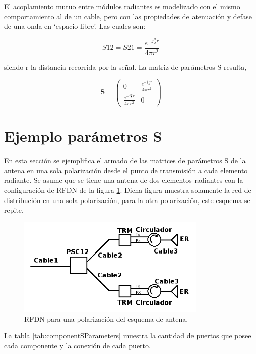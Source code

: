 El acoplamiento mutuo entre módulos radiantes es modelizado con el mismo comportamiento al de un cable, pero con las
propiedades de atenuación y defase de una onda en \enquote*{espacio libre}. Las cuales son:

\begin{equation}
	S12 = S21 = \dfrac{e^{-j\frac{\pi}{\lambda}r}}{4\pi r^2}
\end{equation}

siendo r la distancia recorrida por la señal. La matriz de parámetros S resulta,

$$
\mathbf{S} = \begin{pmatrix} 0 & \frac{e^{-j\frac{\pi}{\lambda}r}}{4\pi r^2}\\\frac{e^{-j\frac{\pi}{\lambda}r}}{4\pi r^2} & 0\end{pmatrix}
$$

\section{Ejemplo parámetros S}

En esta sección se ejemplifica el armado de las matrices de parámetros S de la antena en una sola polarización desde el punto 
de transmisión a cada elemento radiante. Se asume que se tiene una antena de dos elementos radiantes con la configuración de 
RFDN de la figura \ref{fig:antennaS}. Dicha figura muestra solamente la red de distribución en una sola polarización, para la 
otra polarización, este esquema se repite.

\begin{figure}[H]
 \centering
 \includegraphics[width=9cm]{gfx/RFDN.png}
 \caption{RFDN para una polarización del esquema de antena.}
 \label{fig:antennaS}
\end{figure}

La tabla \ref{tab:componentSParameters} muestra la cantidad de puertos que posee cada componente y la conexión de cada puerto.

